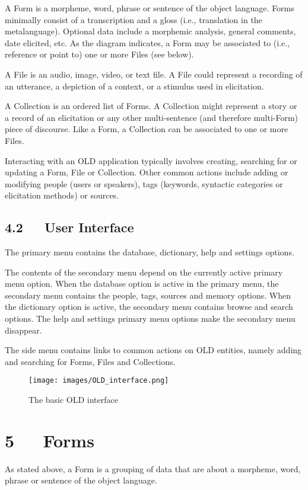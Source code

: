 \documentclass[letterpaper,10pt,english]{sphinxmanual}
\begin{document}
A Form is a morpheme, word, phrase or sentence of the object language.  Forms
minimally consist of a transcription and a gloss (i.e., translation in the
metalanguage).  Optional data include a morphemic analysis, general comments,
date elicited, etc.  As the diagram indicates, a Form may be associated to
(i.e., reference or point to) one or more Files (see below).

A File is an audio, image, video, or text file.  A File could represent a
recording of an utterance, a depiction of a context, or a stimulus used in
elicitation.

A Collection is an ordered list of Forms.  A Collection might represent a story
or a record of an elicitation or any other multi-sentence (and therefore
multi-Form) piece of discourse.  Like a Form, a Collection can be associated
to one or more Files.

Interacting with an OLD application typically involves creating, searching for
or updating a Form, File or Collection.  Other common actions include adding or
modifying people (users or speakers), tags (keywords, syntactic categories or
elicitation methods) or sources.


\section{4.2   User Interface}
\label{user_guide:user-interface}
The primary menu contains the database, dictionary, help and settings options.

The contents of the secondary menu depend on the currently active primary menu
option.  When the database option is active in the primary menu, the secondary
menu contains the people, tags, sources and memory options.  When the dictionary
option is active, the secondary menu contains browse and search options.  The
help and settings primary menu options make the secondary menu disappear.

The side menu contains links to common actions on OLD entities, namely adding
and searching for Forms, Files and Collections.
\begin{figure}[htbp]
\centering
\capstart

\texttt{[image: images/OLD\_interface.png]}
\caption{The basic OLD interface}\end{figure}


\chapter{5   Forms}
\label{user_guide:forms}
As stated above, a Form is a grouping of data that are about a morpheme, word,
phrase or sentence of the object language.
\end{document}
